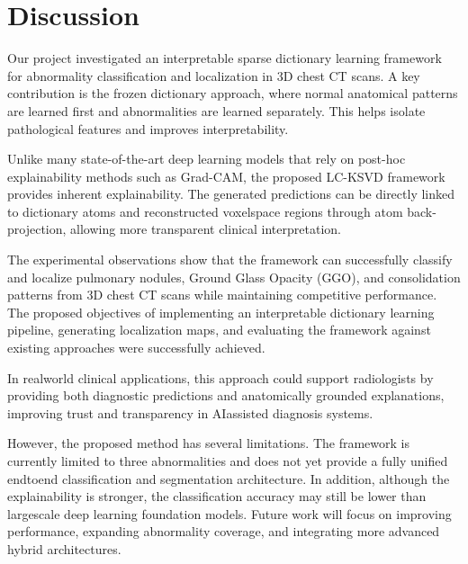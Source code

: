 \chapter{Discussion}
\label{ch:discussion}

Our project investigated an interpretable sparse dictionary learning framework for abnormality classification and localization in 3D chest CT scans. A key contribution is the frozen dictionary approach, where normal anatomical patterns are learned first and abnormalities are learned separately. This helps isolate pathological features and improves interpretability.

Unlike many state-of-the-art deep learning models that rely on post-hoc explainability methods such as Grad-CAM, the proposed LC-KSVD framework provides inherent explainability. The generated predictions can be directly linked to dictionary atoms and reconstructed voxelspace regions through atom back-projection, allowing more transparent clinical interpretation.

The experimental observations show that the framework can successfully classify and localize pulmonary nodules, Ground Glass Opacity (GGO), and consolidation patterns from 3D chest CT scans while maintaining competitive performance. The proposed objectives of implementing an interpretable dictionary learning pipeline, generating localization maps, and evaluating the framework against existing approaches were successfully achieved.

In realworld clinical applications, this approach could support radiologists by providing both diagnostic predictions and anatomically grounded explanations, improving trust and transparency in AIassisted diagnosis systems.

However, the proposed method has several limitations. The framework is currently limited to three abnormalities and does not yet provide a fully unified endtoend classification and segmentation architecture. In addition, although the explainability is stronger, the classification accuracy may still be lower than largescale deep learning foundation models. Future work will focus on improving performance, expanding abnormality coverage, and integrating more advanced hybrid architectures.
